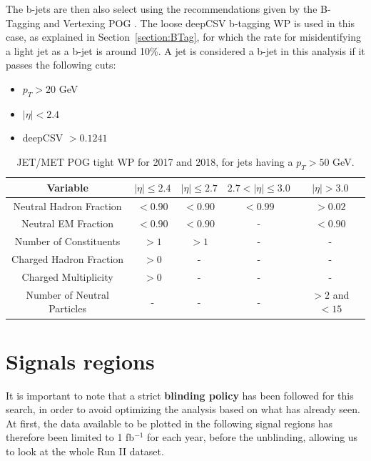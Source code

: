 \documentclass[a4paper, 10pt, openright]{report}
\begin{document}
The b-jets are then also select using the recommendations given by the B-Tagging and Vertexing \ac{POG} \cite{BTagPOG}. The loose deepCSV b-tagging \ac{WP} is used in this case, as explained in Section~\ref{section:BTag}, for which the rate for misidentifying a light jet as a b-jet is around 10\%. A jet is considered a b-jet in this analysis if it passes the following cuts:

\begin{multicols}{3}
\begin{itemize}
\item $p_T > 20$ GeV
\item $|\eta| < 2.4$
\item deepCSV $> 0.1241$ 
\end{itemize}
\end{multicols}

\begin{table}
\begin{center}
\begin{tabular}{ c|c|c|c|c } 
 \hline
 Variable & $|\eta| \leq 2.4$ & $|\eta| \leq 2.7$ & $2.7 < |\eta| \leq 3.0$ & $|\eta| > 3.0$ \\
\hline
Neutral Hadron Fraction & $< 0.90$ & $< 0.90$ & $< 0.99$ & $> 0.02$ \\
Neutral EM Fraction & $< 0.90$ & $< 0.90$ & - & $< 0.90$ \\
Number of Constituents & $> 1$ & $> 1$ & - & - \\
Charged Hadron Fraction & $> 0$ & - & - & - \\
Charged Multiplicity & $> 0$ & - & - & - \\
Number of Neutral Particles & - & - & - & $> 2$ and $< 15$ \\
\hline
\end{tabular}
\caption{JET/MET \ac{POG} tight \ac{WP} for 2017 and 2018, for jets having a $p_T > 50$ GeV.}
\label{table:JetSelPU}
\end{center}
\end{table}

\section{Signals regions} \label{section:SR}

It is important to note that a strict \textbf{blinding policy} has been followed for this search, in order to avoid optimizing the analysis based on what has already seen. At first, the data available to be plotted in the following signal regions has therefore been limited to 1 fb$^{-1}$ for each year, before the unblinding, allowing us to look at the whole Run II dataset.
\end{document}
